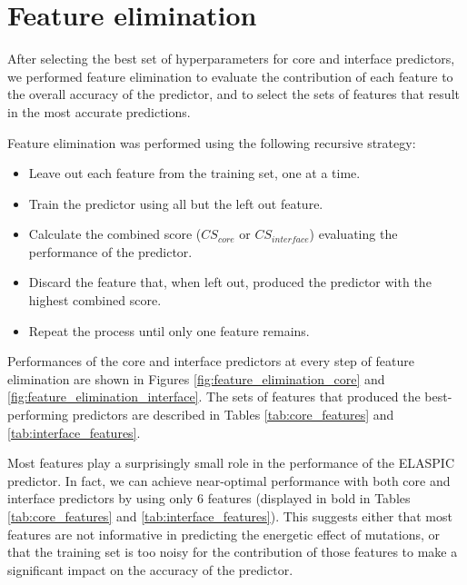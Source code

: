 \clearpage



\clearpage
\section{Feature elimination} \label{sec:feature_elimination}

After selecting the best set of hyperparameters for core and interface predictors, we performed feature elimination to evaluate the contribution of each feature to the overall accuracy of the predictor, and to select the sets of features that result in the most accurate predictions.

Feature elimination was performed using the following recursive strategy:

\vspace{-\topsep}
\begin{itemize}
	\itemsep0em
	\item Leave out each feature from the training set, one at a time.
	\item Train the predictor using all but the left out feature.
	\item Calculate the combined score ($CS_{core}$ or $CS_{interface}$) evaluating the performance of the predictor.
	\item Discard the feature that, when left out, produced the predictor with the highest combined score.
	\item Repeat the process until only one feature remains.
\end{itemize}

Performances of the core and interface predictors at every step of feature elimination are shown in Figures \ref{fig:feature_elimination_core} and \ref{fig:feature_elimination_interface}. The sets of features that produced the best-performing predictors are described in Tables \ref{tab:core_features} and \ref{tab:interface_features}.

Most features play a surprisingly small role in the performance of the ELASPIC predictor. In fact, we can achieve near-optimal performance with both core and interface predictors by using only 6 features (displayed in bold in Tables \ref{tab:core_features} and \ref{tab:interface_features}). This suggests either that most features are not informative in predicting the energetic effect of mutations, or that the training set is too noisy for the contribution of those features to make a significant impact on the accuracy of the predictor.

\clearpage



